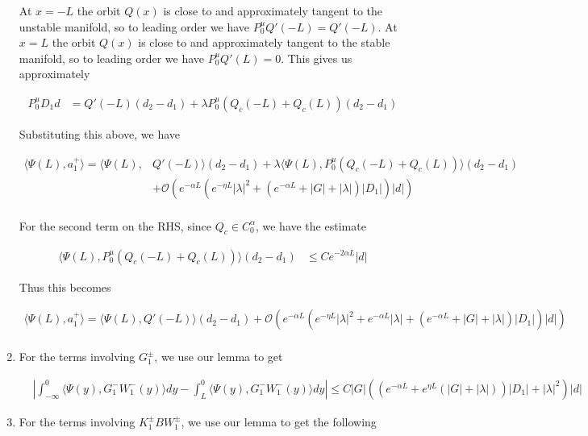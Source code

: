 \documentclass[12pt]{article}
\begin{document}
\begin{enumerate}
At $x = -L$ the orbit $Q(x)$ is close to and approximately tangent to the unstable manifold, so to leading order we have $P_0^u Q'(-L) = Q'(-L)$. At $x = L$ the orbit $Q(x)$ is close to and approximately tangent to the stable manifold, so to leading order we have $P_0^u Q'(L) = 0$. This gives us approximately

\begin{align*}
P_0^u D_1 d &= Q'(-L)(d_2 - d_1) + \lambda P_0^u (Q_c(-L) + Q_c(L))(d_2 - d_1)
\end{align*}

Substituting this above, we have

\begin{align*}
\langle \Psi(L), a_1^+ \rangle = \langle \Psi(L), &Q'(-L) \rangle (d_2 - d_1) + \lambda \langle \Psi(L), P_0^u (Q_c(-L) + Q_c(L))\rangle(d_2 - d_1) \\
&+ \mathcal{O} \left( e^{-\alpha L} (e^{-\eta L}|\lambda|^2 + (e^{-\alpha L} + |G| + |\lambda|)|D_1|)|d| \right)\\
\end{align*}

For the second term on the RHS, since $Q_c \in C_0^\alpha$, we have the estimate

\begin{align*}
\langle \Psi(L), P_0^u (Q_c(-L) + Q_c(L))\rangle(d_2 - d_1) &\leq C e^{-2 \alpha L}|d|
\end{align*}

Thus this becomes

\begin{align*}
\langle \Psi(L), a_1^+ \rangle = \langle \Psi(L), Q'(-L) \rangle (d_2 - d_1) + \mathcal{O} \left( e^{-\alpha L} (e^{-\eta L}|\lambda|^2 + e^{-\alpha L}|\lambda| + (e^{-\alpha L} + |G| + |\lambda|)|D_1|)|d| \right)\\
\end{align*}

\item For the terms involving $G_1^\pm$, we use our lemma to get 

\begin{align*}
&\left| \int_{-\infty}^0 \langle \Psi(y), G_1^- W_1^-(y) \rangle dy - \int_L^0 \langle \Psi(y), G_1^- W_1^-(y) \rangle dy\right| \leq C|G| \left( \left( e^{-\alpha L} + e^{\eta L}(|G| + |\lambda|)  \right) |D_1| + |\lambda|^2 \right)|d|
\end{align*}

\item For the terms involving $K_1^\pm B W_1^\pm$, we use our lemma to get the following


\end{enumerate}
\end{document}
